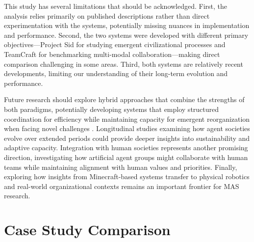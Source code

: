 \documentclass[a4paper, 12pt]{article}
\begin{document}
This study has several limitations that should be acknowledged. First, the analysis relies primarily on published descriptions rather than direct experimentation with the systems, potentially missing nuances in implementation and performance. Second, the two systems were developed with different primary objectives---Project Sid for studying emergent civilizational processes and TeamCraft for benchmarking multi-modal collaboration---making direct comparison challenging in some areas. Third, both systems are relatively recent developments, limiting our understanding of their long-term evolution and performance.

Future research should explore hybrid approaches that combine the strengths of both paradigms, potentially developing systems that employ structured coordination for efficiency while maintaining capacity for emergent reorganization when facing novel challenges \autocite{qiu2024collaborativeintelligencepropagatingintentions,chen2024sagentsselforganizingagentsopenended}. Longitudinal studies examining how agent societies evolve over extended periods could provide deeper insights into sustainability and adaptive capacity. Integration with human societies represents another promising direction, investigating how artificial agent groups might collaborate with human teams while maintaining alignment with human values and priorities. Finally, exploring how insights from Minecraft-based systems transfer to physical robotics and real-world organizational contexts remains an important frontier for MAS research.


\clearpage
% 
% 
\printbibliography[heading=bibintoc,title={References}]



\clearpage
\appendix
\renewcommand{\thesection}{\Alph{section}}  %

\clearpage
\section{Case Study Comparison}
\label{appendix:casestudycomparison}
\end{document}
